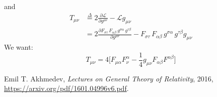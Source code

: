 \documentclass[]{article}
\newcommand{\Lagr}{\mathscr{L}}
\begin{document}
and
\begin{align}
T_{\mu\nu}&\overset{\Delta}{=}2 \frac{\partial \Lagr}{\partial g^{\mu\nu}} - \Lagr g_{\mu\nu}\\
&=2\frac{\partial F_{\sigma\tau}\, F_{\alpha\beta} \, g^{\sigma\alpha} \, g^{\tau\beta}}{\partial g^{\mu\nu}} - F_{\sigma\tau}\, F_{\alpha\beta} \, g^{\sigma\alpha} \, g^{\tau\beta} g_{\mu\nu}
\end{align}
We want:
$$T_{\mu\nu} = 4\big[F_{\mu\alpha} F^\alpha_\nu - \frac{1}{4}g_{\mu\nu} F_{\alpha\beta} F^{\alpha\beta}\big]$$

\begin{thebibliography}{9}

Emil T. Akhmedev,
\emph{Lectures on General Theory of Relativity},
2016,
\url{https://arxiv.org/pdf/1601.04996v6.pdf}.

\end{thebibliography}
\end{document}
